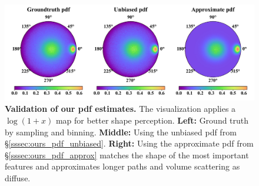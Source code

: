\begin{figure}[t]
	\centering
	\includegraphics[width=\columnwidth]{img/validations/lobe_pdf/pdf.pdf}
	\caption{\textbf{Validation of our pdf estimates.} The visualization applies a $\log(1+x)$ map for better shape perception. \textbf{Left:} Ground truth by sampling and binning. \textbf{Middle:} Using the unbiased pdf from \S\ref{sssec:ours_pdf_unbiased}. \textbf{Right:} Using the approximate pdf from \S\ref{sssec:ours_pdf_approx} matches the shape of the most important features and approximates longer paths and volume scattering as diffuse.}
	\label{fig:pdf-validate}
\end{figure}
